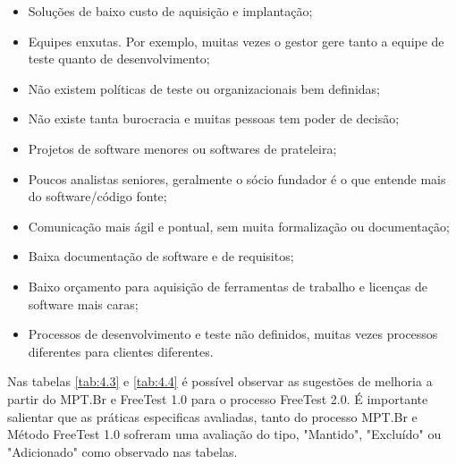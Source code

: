 \begin{itemize}
    \item Soluções de baixo custo de aquisição e implantação;
    \item Equipes enxutas. Por exemplo, muitas vezes o gestor gere tanto a equipe de teste quanto de desenvolvimento;
    \item Não existem políticas de teste ou organizacionais bem definidas;
    \item Não existe tanta burocracia e muitas pessoas tem poder de decisão;
    \item Projetos de software menores ou softwares de prateleira;
    \item Poucos analistas seniores, geralmente o sócio fundador é o que entende mais do software/código fonte;
    \item Comunicação mais ágil e pontual, sem muita formalização ou documentação;
    \item Baixa documentação de software e de requisitos;
    \item Baixo orçamento para aquisição de ferramentas de trabalho e licenças de software mais caras;
    \item Processos de desenvolvimento e teste não definidos, muitas vezes processos diferentes para clientes diferentes.
\end{itemize}

Nas tabelas \ref{tab:4.3} e \ref{tab:4.4} é possível observar as sugestões de melhoria a partir do MPT.Br e FreeTest 1.0 para o processo FreeTest 2.0. É importante salientar que as práticas especificas avaliadas, tanto do processo MPT.Br e Método FreeTest 1.0 sofreram uma avaliação do tipo, "Mantido", "Excluído" ou "Adicionado" como observado nas tabelas. 

